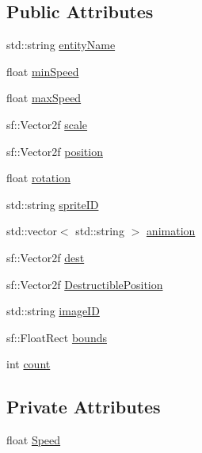 \subsection*{Public Attributes}
\begin{DoxyCompactItemize}
\item 
std\+::string \hyperlink{classant_1_1_component_settings_ad2d40618bceb1e55dcefd5ed9770a3da}{entity\+Name}
\item 
float \hyperlink{classant_1_1_component_settings_a60bbb1cde99a1524cac65b3ea6ced5d4}{min\+Speed}
\item 
float \hyperlink{classant_1_1_component_settings_aa986b37a02f101f7c0ee17a4e8baf869}{max\+Speed}
\item 
sf\+::\+Vector2f \hyperlink{classant_1_1_component_settings_af5401836ccc8522236ce460c3b0b7dc4}{scale}
\item 
sf\+::\+Vector2f \hyperlink{classant_1_1_component_settings_a804dcaebc434be8174762ac18fa8c8e9}{position}
\item 
float \hyperlink{classant_1_1_component_settings_af6510ce7e9046dae09b36ae090ff29e2}{rotation}
\item 
std\+::string \hyperlink{classant_1_1_component_settings_aa75c8c1dee1ae6487858af03b2c0d0ce}{sprite\+I\+D}
\item 
std\+::vector$<$ std\+::string $>$ \hyperlink{classant_1_1_component_settings_a31983ef81c97cd5ed7e7fc858dca0790}{animation}
\item 
sf\+::\+Vector2f \hyperlink{classant_1_1_component_settings_a17c51bba2be5a2a29db30c2aea842f23}{dest}
\item 
sf\+::\+Vector2f \hyperlink{classant_1_1_component_settings_a29c818f14771a383adda38637635235c}{Destructible\+Position}
\item 
std\+::string \hyperlink{classant_1_1_component_settings_abd24a47a0779d046fd85b00a79f2dc75}{image\+I\+D}
\item 
sf\+::\+Float\+Rect \hyperlink{classant_1_1_component_settings_a73dafad1f52d54aed792e01c74c4d7d5}{bounds}
\item 
int \hyperlink{classant_1_1_component_settings_a38cc2b2e94b54f023df27b3553af19ed}{count}
\end{DoxyCompactItemize}
\subsection*{Private Attributes}
\begin{DoxyCompactItemize}
\item 
float \hyperlink{classant_1_1_component_settings_a56a5b8bb6e11382014d1b160517a27d8}{Speed}
\end{DoxyCompactItemize}


